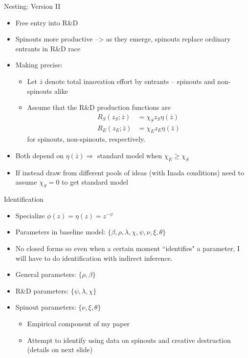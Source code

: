 \documentclass[english,usenames,dvipsnames]{beamer}
\begin{document}
\begin{frame}{Nesting: Version II}
\begin{itemize}
	\item Free entry into R\&D
	\item Spinouts more productive --> as they emerge, spinouts replace ordinary entrants in R\&D race
	\item Making precise:
	\begin{itemize}
		\item Let $\bar{z}$ denote total innovation effort by entrants -- spinouts and non-spinouts alike
		\item Assume that the R\&D production functions are
		\begin{align*}
		R_S (z_S; \bar{z}) &= \chi_S z_S \eta(\bar{z}) \\ 
		R_E (z_E; \bar{z}) &= \chi_E z_E \eta(\bar{z}) 
		\end{align*}
		for spinouts, non-spinouts, respectively.
	\end{itemize}  
	\item Both depend on $\eta(\bar{z}) \Rightarrow$ standard model when $\chi_E \ge \chi_S$
	\item If instead draw from different pools of ideas (with Inada conditions) need to assume $\chi_S = 0$ to get standard model
\end{itemize}
\end{frame}

\begin{frame}{Identification}
\begin{itemize}
	\item Specialize $\phi(z) = \eta(z) = z^{-\psi}$ 
	\item Parameters in baseline model: $\{\beta,\rho,\lambda,\chi,\psi,\nu,\xi,\theta\}$
	\item No closed forms so even when a certain moment ``identifies" a parameter, I will have to do identification with indirect inference. 
	\item General parameters: $\{\rho,\beta\}$
	\item R\&D parameters: $\{\psi,\lambda, \chi\}$
	\item Spinout parameters: $\{ \nu,\xi,\theta \}$
	\begin{itemize}
		\item Empirical component of my paper
		\item Attempt to identify using data on spinouts and creative destruction (details on next slide)
	\end{itemize}
\end{itemize}
\end{frame}
\end{document}
